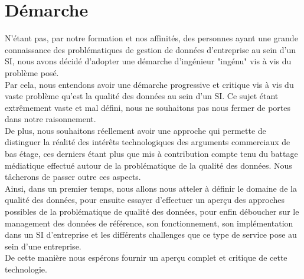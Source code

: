 \section{Démarche}

N'étant pas, par notre formation et nos affinités, des personnes ayant une grande connaissance des problématiques de gestion de données d'entreprise au sein d'un SI, nous avons décidé d'adopter une démarche d'ingénieur "ingénu"  vis à vis du problème posé.\\
Par cela, nous entendons avoir une démarche progressive et critique vis à vis du vaste problème qu'est la qualité des données au sein d'un SI. Ce sujet étant extrêmement vaste et mal défini, nous ne souhaitons pas nous fermer de portes dans notre raisonnement.\\
De plus, nous souhaitons réellement avoir une approche qui permette de distinguer la réalité des intérêts technologiques des arguments commerciaux de bas étage, ces derniers étant plus que mis à contribution  compte tenu du battage médiatique effectué autour de la problématique de la qualité des données. Nous tâcherons de passer outre ces aspects.\\
Ainsi, dans un premier temps, nous allons nous atteler à définir le domaine de la qualité des données, pour ensuite essayer d'effectuer un aperçu des approches possibles de la problématique de qualité des données, pour enfin déboucher sur le management des données de référence, son fonctionnement, son implémentation dans un SI d'entreprise et les différents challenges que ce type de service pose au sein d'une entreprise.\\
De cette manière nous espérons fournir un aperçu complet et critique de cette technologie. 
